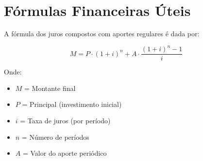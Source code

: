 \documentclass[
  12pt,
  a4paper,
  openright,
  oneside,
  chapter=TITLE,
  section=TITLE
]{abntex2}
\begin{document}
\begin{center}
\end{center}

\section{Fórmulas Financeiras Úteis}

A fórmula dos juros compostos com aportes regulares é dada por:

$$M = P \cdot (1 + i)^n + A \cdot \frac{(1 + i)^n - 1}{i}$$

Onde:
\begin{itemize}
    \item $M$ = Montante final
    \item $P$ = Principal (investimento inicial)
    \item $i$ = Taxa de juros (por período)
    \item $n$ = Número de períodos
    \item $A$ = Valor do aporte periódico
\end{itemize}
\end{document}
